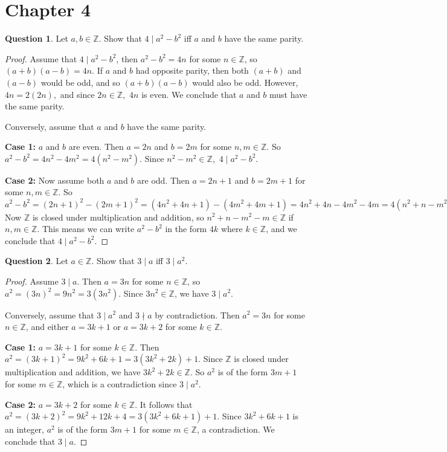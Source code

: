 \documentclass{article}
\theoremstyle{definition}
\newtheorem{question}{Question}
\begin{document}
\section*{Chapter 4}
\begin{question}
    Let $a,b \in \mathbb{Z}.$ Show that $4 \mid a^2-b^2$ iff $a$ and $b$ have the same parity.
\end{question}
\begin{proof}
    Assume that $4 \mid a^2 - b^2$, then $a^2-b^2=4n$ for some $n \in \mathbb{Z}$, so $(a+b)(a-b)=4n.$ If $a$ and $b$ had opposite parity, then both $(a+b)$ and $(a-b)$ would be odd, and so $(a+b)(a-b)$ would also be odd. However, $4n=2(2n),$ and since $2n \in \mathbb{Z},$ $4n$ is even. We conclude that $a$ and $b$ must have the same parity.

    Conversely, assume that $a$ and $b$ have the same parity.

    \textbf{Case 1:} $a$ and $b$ are even. Then $a=2n$ and $b=2m$ for some $n,m \in \mathbb{Z}.$ So $a^2-b^2 = 4n^2-4m^2 = 4(n^2-m^2).$ Since $n^2-m^2 \in \mathbb{Z},$ $4 \mid a^2-b^2.$

    \textbf{Case 2:} Now assume both $a$ and $b$ are odd. Then $a=2n+1$ and $b=2m+1$ for some $n,m \in \mathbb{Z}$. So $a^2-b^2=(2n+1)^2-(2m+1)^2=(4n^2+4n+1)-(4m^2+4m+1)=4n^2+4n-4m^2-4m=4(n^2+n-m^2-m).$ Now $\mathbb{Z}$ is closed under multiplication and addition, so $n^2+n-m^2-m \in \mathbb{Z}$ if $n,m \in \mathbb{Z}$. This means we can write $a^2-b^2$ in the form $4k$ where $k \in \mathbb{Z}$, and we conclude that $4 \mid a^2-b^2.$
\end{proof}
\begin{question}
    Let $a \in \mathbb{Z}$. Show that $3 \mid a$ iff $3 \mid a^2$.
\end{question}
\begin{proof}
    Assume $3 \mid a.$ Then $a=3n$ for some $n \in \mathbb{Z}$, so $a^2=(3n)^2=9n^2=3(3n^2)$. Since $3n^2 \in \mathbb{Z}$, we have $3 \mid a^2.$ 
    
    Conversely, assume that $3 \mid a^2$ and $3 \nmid a$ by contradiction. Then $a^2=3n$ for some $n\in\mathbb{Z}$, and either $a=3k+1$ or $a=3k+2$ for some $k\in\mathbb{Z}$.

    \textbf{Case 1:} $a=3k+1$ for some $k\in\mathbb{Z}$. Then $a^2=(3k+1)^2=9k^2+6k+1=3(3k^2+2k)+1.$ Since $\mathbb{Z}$ is closed under multiplication and addition, we have $3k^2+2k \in \mathbb{Z}.$ So $a^2$ is of the form $3m+1$ for some $m \in \mathbb{Z}$, which is a contradiction since $3 \mid a^2.$

    \textbf{Case 2:} $a=3k+2$ for some $k \in \mathbb{Z}.$ It follows that $a^2=(3k+2)^2=9k^2+12k+4=3(3k^2+6k+1)+1.$ Since $3k^2+6k+1$ is an integer, $a^2$ is of the form $3m+1$ for some $m \in \mathbb{Z}$, a contradiction. We conclude that $3 \mid a.$
\end{proof}
\end{document}
